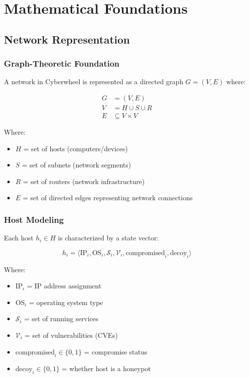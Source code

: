 \documentclass[12pt,a4paper]{article}
\begin{document}
\section{Mathematical Foundations}

\subsection{Network Representation}

\subsubsection{Graph-Theoretic Foundation}
A network in Cyberwheel is represented as a directed graph $G = (V, E)$ where:

\begin{align}
G &= (V, E) \\
V &= H \cup S \cup R \\
E &\subseteq V \times V
\end{align}

Where:
\begin{itemize}
    \item $H$ = set of hosts (computers/devices)
    \item $S$ = set of subnets (network segments)
    \item $R$ = set of routers (network infrastructure)
    \item $E$ = set of directed edges representing network connections
\end{itemize}

\subsubsection{Host Modeling}
Each host $h_i \in H$ is characterized by a state vector:

\begin{equation}
h_i = \langle \text{IP}_i, \text{OS}_i, \mathcal{S}_i, \mathcal{V}_i, \text{compromised}_i, \text{decoy}_i \rangle
\end{equation}

Where:
\begin{itemize}
    \item $\text{IP}_i$ = IP address assignment
    \item $\text{OS}_i$ = operating system type
    \item $\mathcal{S}_i$ = set of running services
    \item $\mathcal{V}_i$ = set of vulnerabilities (CVEs)
    \item $\text{compromised}_i \in \{0, 1\}$ = compromise status
    \item $\text{decoy}_i \in \{0, 1\}$ = whether host is a honeypot
\end{itemize}
\end{document}
